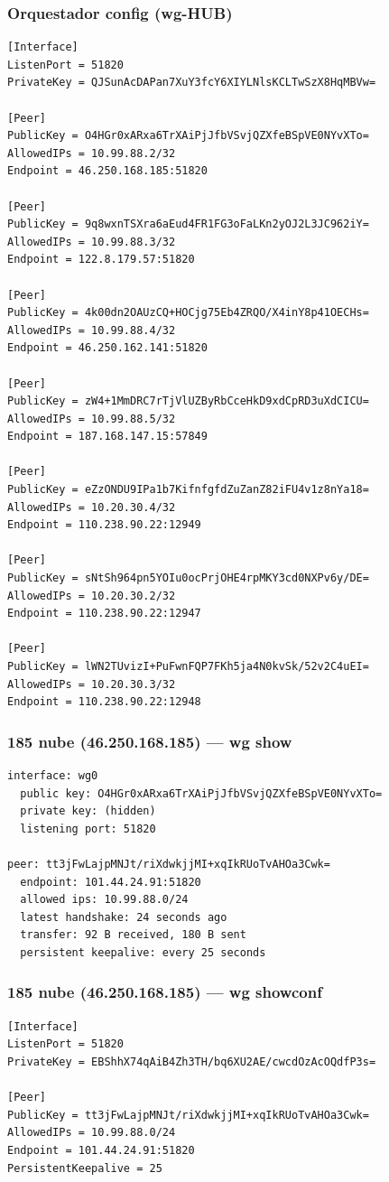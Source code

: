 \documentclass[11pt,a4paper]{article}
\begin{document}
\subsubsection*{Orquestador config (wg-HUB)}
\begin{lstlisting}
[Interface]
ListenPort = 51820
PrivateKey = QJSunAcDAPan7XuY3fcY6XIYLNlsKCLTwSzX8HqMBVw=

[Peer]
PublicKey = O4HGr0xARxa6TrXAiPjJfbVSvjQZXfeBSpVE0NYvXTo=
AllowedIPs = 10.99.88.2/32
Endpoint = 46.250.168.185:51820

[Peer]
PublicKey = 9q8wxnTSXra6aEud4FR1FG3oFaLKn2yOJ2L3JC962iY=
AllowedIPs = 10.99.88.3/32
Endpoint = 122.8.179.57:51820

[Peer]
PublicKey = 4k00dn2OAUzCQ+HOCjg75Eb4ZRQO/X4inY8p41OECHs=
AllowedIPs = 10.99.88.4/32
Endpoint = 46.250.162.141:51820

[Peer]
PublicKey = zW4+1MmDRC7rTjVlUZByRbCceHkD9xdCpRD3uXdCICU=
AllowedIPs = 10.99.88.5/32
Endpoint = 187.168.147.15:57849

[Peer]
PublicKey = eZzONDU9IPa1b7KifnfgfdZuZanZ82iFU4v1z8nYa18=
AllowedIPs = 10.20.30.4/32
Endpoint = 110.238.90.22:12949

[Peer]
PublicKey = sNtSh964pn5YOIu0ocPrjOHE4rpMKY3cd0NXPv6y/DE=
AllowedIPs = 10.20.30.2/32
Endpoint = 110.238.90.22:12947

[Peer]
PublicKey = lWN2TUvizI+PuFwnFQP7FKh5ja4N0kvSk/52v2C4uEI=
AllowedIPs = 10.20.30.3/32
Endpoint = 110.238.90.22:12948

\end{lstlisting}

\subsubsection*{185 nube (46.250.168.185) — wg show}
\begin{lstlisting}
interface: wg0
  public key: O4HGr0xARxa6TrXAiPjJfbVSvjQZXfeBSpVE0NYvXTo=
  private key: (hidden)
  listening port: 51820

peer: tt3jFwLajpMNJt/riXdwkjjMI+xqIkRUoTvAHOa3Cwk=
  endpoint: 101.44.24.91:51820
  allowed ips: 10.99.88.0/24
  latest handshake: 24 seconds ago
  transfer: 92 B received, 180 B sent
  persistent keepalive: every 25 seconds

\end{lstlisting}

\subsubsection*{185 nube (46.250.168.185) — wg showconf}
\begin{lstlisting}
[Interface]
ListenPort = 51820
PrivateKey = EBShhX74qAiB4Zh3TH/bq6XU2AE/cwcdOzAcOQdfP3s=

[Peer]
PublicKey = tt3jFwLajpMNJt/riXdwkjjMI+xqIkRUoTvAHOa3Cwk=
AllowedIPs = 10.99.88.0/24
Endpoint = 101.44.24.91:51820
PersistentKeepalive = 25

\end{lstlisting}
\end{document}
